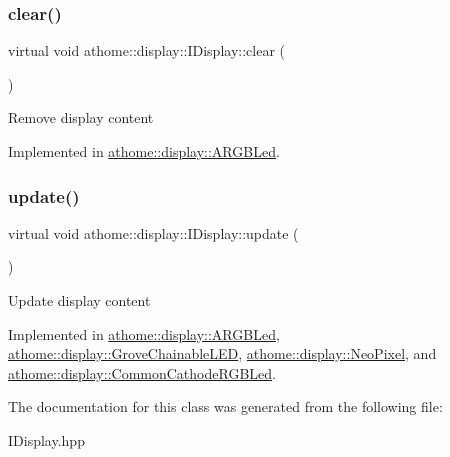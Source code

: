 \subsubsection{\texorpdfstring{clear()}{clear()}}
{\footnotesize\ttfamily virtual void athome\+::display\+::\+I\+Display\+::clear (\begin{DoxyParamCaption}{ }\end{DoxyParamCaption})\hspace{0.3cm}{\ttfamily [pure virtual]}}

Remove display content 

Implemented in \mbox{\hyperlink{classathome_1_1display_1_1_a_r_g_b_led_a9753e3a23ea5cb6b0a41079bc6128766}{athome\+::display\+::\+A\+R\+G\+B\+Led}}.

\mbox{\label{classathome_1_1display_1_1_i_display_a4ba7bd5d46f88578f1c846f4f5f3c5d1}} 
\subsubsection{\texorpdfstring{update()}{update()}}
{\footnotesize\ttfamily virtual void athome\+::display\+::\+I\+Display\+::update (\begin{DoxyParamCaption}{ }\end{DoxyParamCaption})\hspace{0.3cm}{\ttfamily [pure virtual]}}

Update display content 

Implemented in \mbox{\hyperlink{classathome_1_1display_1_1_a_r_g_b_led_a725ceca0c01735daa9c95148baf075ab}{athome\+::display\+::\+A\+R\+G\+B\+Led}}, \mbox{\hyperlink{classathome_1_1display_1_1_grove_chainable_l_e_d_a05a4a1381396b7fc11a24993865d8226}{athome\+::display\+::\+Grove\+Chainable\+L\+ED}}, \mbox{\hyperlink{classathome_1_1display_1_1_neo_pixel_a272bca4da78dff7dc02bcd023665e013}{athome\+::display\+::\+Neo\+Pixel}}, and \mbox{\hyperlink{classathome_1_1display_1_1_common_cathode_r_g_b_led_ab78ab6aef619d8e0941dd11d4cfbb545}{athome\+::display\+::\+Common\+Cathode\+R\+G\+B\+Led}}.



The documentation for this class was generated from the following file\+:\begin{DoxyCompactItemize}
\item 
I\+Display.\+hpp\end{DoxyCompactItemize}
